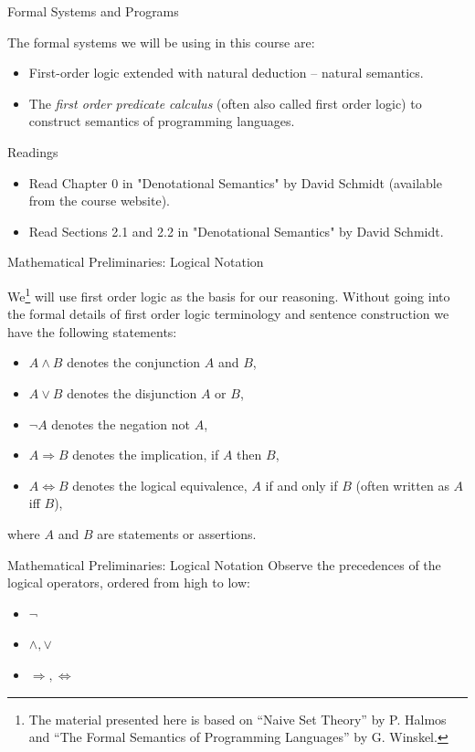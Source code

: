 \documentclass{beamer}
\begin{document}
\begin{frame}{Formal Systems and Programs}

The formal systems we will be using in this course are:
\begin{itemize}
\item First-order logic extended with natural deduction -- natural semantics.
\item The {\em first order predicate calculus} (often also called first order logic) to construct semantics of programming languages.
\end{itemize}
\end{frame}

\begin{frame}{Readings}
\begin{itemize}
\item Read Chapter 0 in "Denotational Semantics" by David Schmidt (available from the course website).
\item Read Sections 2.1 and 2.2 in "Denotational Semantics" by David Schmidt.
\end{itemize}
\end{frame}

\begin{frame}{\large Mathematical  Preliminaries: Logical Notation}

We\footnote{\tiny The material presented here is based on ``Naive Set Theory'' by P. Halmos and ``The Formal Semantics of Programming Languages'' by G. Winskel.}
will use first order logic as the basis for our reasoning.  Without going into the formal details
of first order logic terminology and sentence construction we have the following statements:
\begin{itemize}
\item $A \wedge B$ denotes the conjunction $A$ and $B$,
\item $A \vee B$ denotes the disjunction $A$ or $B$,
\item $\neg A$ denotes the negation not $A$,
\item $A \Rightarrow B$ denotes the implication, if $A$ then $B$,
\item $A \Leftrightarrow B$ denotes the logical equivalence, $A$ if and only if $B$ (often
written as $A$ iff $B$),
\end{itemize}
where $A$ and $B$ are statements or assertions.
\vspace{.1in}
 \end{frame}

\begin{frame}{\large Mathematical  Preliminaries: Logical Notation}
Observe the precedences of the logical operators, ordered from high to low:
\begin{itemize}
\item $\neg$
\item $\wedge,\vee$
\item $\Rightarrow, \Leftrightarrow$
\end{itemize}
\end{frame}
\end{document}
